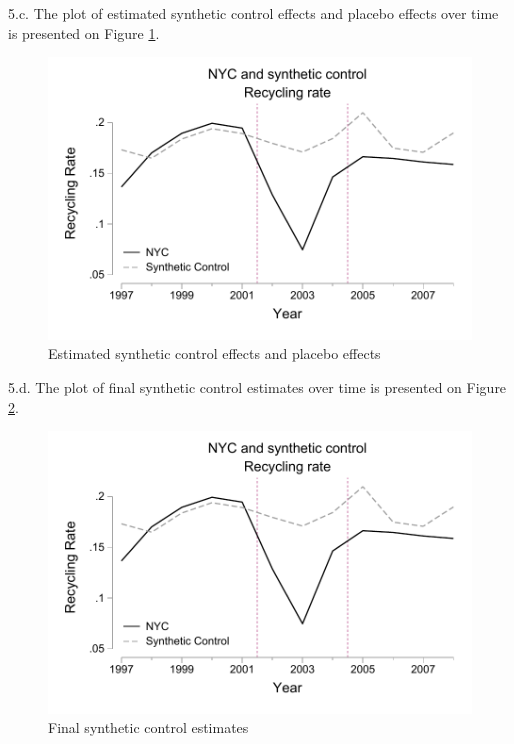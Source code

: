 \documentclass{article}
\begin{document}
\clearpage

\noindent 5.c. The plot of estimated synthetic control effects and placebo effects over time is presented on Figure \ref{fig:placebo}.
\begin{figure}[h!]
    \centering
    \includegraphics{homework 9/output/figure/scplacebos.pdf}
    \caption{Estimated synthetic control effects and placebo effects}
    \label{fig:placebo}
\end{figure}


\clearpage

\noindent 5.d. The plot of final synthetic control estimates over time is presented on Figure \ref{fig:SCestimates}. 
\begin{figure}[h!]
    \centering
    \includegraphics{homework 9/output/figure/scestimates.pdf}
    \caption{Final synthetic control estimates}
    \label{fig:SCestimates}
\end{figure}
\end{document}
